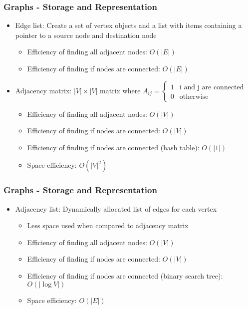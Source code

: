 \begin{frame}\frametitle{Graphs - Storage and Representation}
\begin{itemize}
\item Edge list: Create a set of vertex objects and a list with items containing a pointer to a source node and destination node
	\begin{itemize}
	\item Efficiency of finding all adjacent nodes: $O(|E|)$
	\item Efficiency of finding if nodes are connected: $O(|E|)$
	\end{itemize}
\item Adjacency matrix: $|V| \times |V|$ matrix where $A_{i j} = \begin{cases}1 & \text{i and j are connected}\\ 0 & \text{otherwise}\end{cases}$
	\begin{itemize}
	\item Efficiency of finding all adjacent nodes: $O(|V|)$
	\item Efficiency of finding if nodes are connected: $O(|V|)$
	\item Efficiency of finding if nodes are connected (hash table): $O(|1|)$
	\item Space efficiency: $O(|V|^2)$
	\end{itemize}
\end{itemize}
\end{frame}

\begin{frame}\frametitle{Graphs - Storage and Representation}
\begin{itemize}
\item Adjacency list: Dynamically allocated list of edges for each vertex
	\begin{itemize}
	\item Less space used when compared to adjacency matrix
	\item Efficiency of finding all adjacent nodes: $O(|V|)$
	\item Efficiency of finding if nodes are connected: $O(|V|)$
	\item Efficiency of finding if nodes are connected (binary search tree): $O(|\log V|)$
	\item Space efficiency: $O(|E|)$
	\end{itemize}
\end{itemize}
\end{frame}

